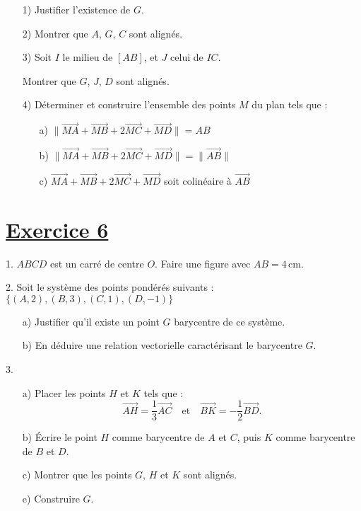 \documentclass[12pt]{article}
\begin{document}
\begin{enumerate}
    \item[1)] Justifier l'existence de \( G \).
    
    \item[2)] Montrer que \( A \), \( G \), \( C \) sont alignés.
    
    \item[3)] Soit \( I \) le milieu de \( [AB] \), et \( J \) celui de \( IC \). 
    
    Montrer que \( G \), \( J \), \( D \) sont alignés.
    
    \item[4)] Déterminer et construire l'ensemble des points \( M \) du plan tels que :
    \begin{enumerate}
        \item[a)] \( \| \overrightarrow{MA} + \overrightarrow{MB} + 2\overrightarrow{MC} + \overrightarrow{MD} \| = AB \)
        \item[b)] \( \| \overrightarrow{MA} + \overrightarrow{MB} + 2\overrightarrow{MC} + \overrightarrow{MD} \| = \| \overrightarrow{AB} \| \)
        \item[c)] \( \overrightarrow{MA} + \overrightarrow{MB} + 2\overrightarrow{MC} + \overrightarrow{MD}  \) soit colinéaire à \( \overrightarrow{AB} \)
    \end{enumerate}
\end{enumerate}

\section*{\underline{Exercice 6}}

1. \( ABCD \) est un carré de centre \( O \). Faire une figure avec \( AB = 4 \, \text{cm} \).

2. Soit le système des points pondérés suivants : \( \{(A, 2), (B, 3), (C, 1), (D, -1)\} \)
\begin{enumerate}
    \item[a)] Justifier qu'il existe un point \( G \) barycentre de ce système.
    \item[b)] En déduire une relation vectorielle caractérisant le barycentre \( G \).
\end{enumerate}

3. 
\begin{enumerate}
    \item[a)] Placer les points \( H \) et \( K \) tels que :
    \[
    \overrightarrow{AH} = \frac{1}{3} \overrightarrow{AC} \quad \text{et} \quad \overrightarrow{BK} = - \frac{1}{2} \overrightarrow{BD}.
    \]
    \item[b)] Écrire le point \( H \) comme barycentre de \( A \) et \( C \), puis \( K \) comme barycentre de \( B \) et \( D \).
    \item[c)] Montrer que les points \( G \), \( H \) et \( K \) sont alignés.
    \item[e)] Construire \( G \).
\end{enumerate}
\end{document}
